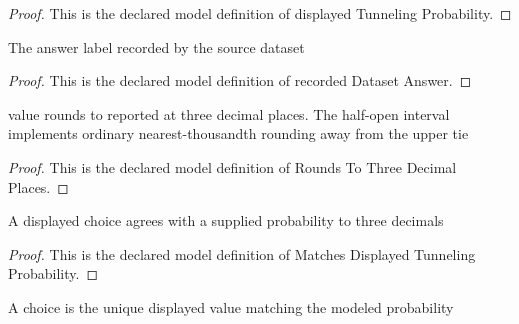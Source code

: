 \begin{proof}
  This is the declared model definition of displayed Tunneling Probability.
\end{proof}
\begin{definition}
  \label{def:physics:phyx-mini-0520:phyxminiproblems-problemphyxmini0520-recordeddatasetanswer}
  The answer label recorded by the source dataset
\end{definition}
\begin{proof}
  This is the declared model definition of recorded Dataset Answer.
\end{proof}
\begin{definition}
  \label{def:physics:phyx-mini-0520:phyxminiproblems-problemphyxmini0520-roundstothreedecimalplaces}
  value rounds to reported at three decimal places. The half-open interval implements ordinary nearest-thousandth rounding away from the upper tie
\end{definition}
\begin{proof}
  This is the declared model definition of Rounds To Three Decimal Places.
\end{proof}
\begin{definition}
  \label{def:physics:phyx-mini-0520:phyxminiproblems-problemphyxmini0520-matchesdisplayedtunnelingprobability}
  A displayed choice agrees with a supplied probability to three decimals
\end{definition}
\begin{proof}
  This is the declared model definition of Matches Displayed Tunneling Probability.
\end{proof}
\begin{definition}
  \label{def:physics:phyx-mini-0520:phyxminiproblems-problemphyxmini0520-isuniquematchingtunnelingchoice}
  A choice is the unique displayed value matching the modeled probability
\end{definition}
